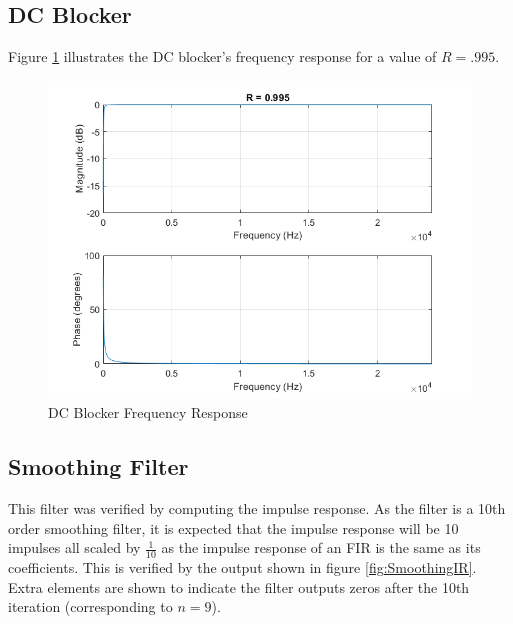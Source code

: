 \documentclass[../main.tex]{subfiles}
\begin{document}
\clearpage

\subsection{DC Blocker}
Figure \ref{fig:DCBlockerResponse} illustrates the DC blocker's frequency response for a value of $R = .995$.

\begin{figure}[h]
    \centering
    \includegraphics[scale=.65]{./images/plots/DCBlockerResponse.png}
    \caption{DC Blocker Frequency Response}
    \label{fig:DCBlockerResponse}
\end{figure}

\subsection{Smoothing Filter}
This filter was verified by computing the impulse response. As the filter is a 10th order smoothing filter, it is expected that the impulse response will be 10 impulses all scaled by $\frac{1}{10}$ as the impulse response of an FIR is the same as its coefficients. This is verified by the output shown in figure \ref{fig:SmoothingIR}. Extra elements are shown to indicate the filter outputs zeros after the 10th iteration (corresponding to $n = 9$).
\end{document}
